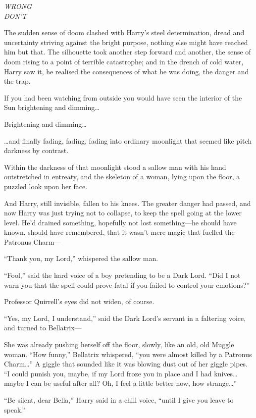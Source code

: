 \emph{WRONG}\\\emph{DON'T}

The sudden sense of doom clashed with Harry's steel determination, dread
and uncertainty striving against the bright purpose, nothing else might
have reached him but that. The silhouette took another step forward and
another, the sense of doom rising to a point of terrible catastrophe;
and in the drench of cold water, Harry saw it, he realised the
consequences of what he was doing, the danger and the trap.

If you had been watching from outside you would have seen the interior
of the Sun brightening and dimming\ldots{}

Brightening and dimming\ldots{}

\ldots{}and finally fading, fading, fading into ordinary moonlight that
seemed like pitch darkness by contrast.

Within the darkness of that moonlight stood a sallow man with his hand
outstretched in entreaty, and the skeleton of a woman, lying upon the
floor, a puzzled look upon her face.

And Harry, still invisible, fallen to his knees. The greater danger had
passed, and now Harry was just trying not to collapse, to keep the spell
going at the lower level. He'd drained something, hopefully not lost
something---he should have known, should have remembered, that it wasn't
mere magic that fuelled the Patronus Charm---

``Thank you, my Lord,'' whispered the sallow man.

``Fool,'' said the hard voice of a boy pretending to be a Dark Lord.
``Did I not warn you that the spell could prove fatal if you failed to
control your emotions?''

Professor Quirrell's eyes did not widen, of course.

``Yes, my Lord, I understand,'' said the Dark Lord's servant in a
faltering voice, and turned to Bellatrix---

She was already pushing herself off the floor, slowly, like an old, old
Muggle woman. ``How funny,'' Bellatrix whispered, ``you were almost
killed by a Patronus Charm\ldots{}'' A giggle that sounded like it was
blowing dust out of her giggle pipes. ``I could punish you, maybe, if my
Lord froze you in place and I had knives\ldots{} maybe I can be useful
after all? Oh, I feel a little better now, how strange\ldots{}''

``Be silent, dear Bella,'' Harry said in a chill voice, ``until I give
you leave to speak.''

